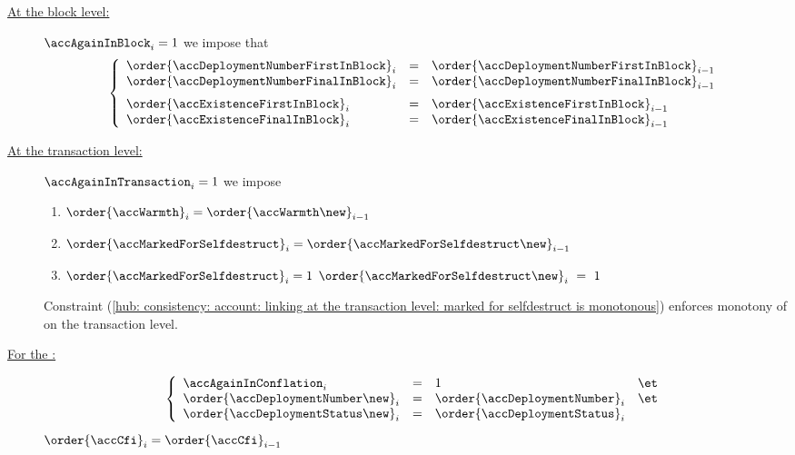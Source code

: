 \begin{description}
	\item[\underline{At the block level:}]
		\If $\accAgainInBlock_{i} = 1$
		\Then we impose that
		\[
			\left\{ \begin{array}{lcl}
				\order{\accDeploymentNumberFirstInBlock} _{i} & = & \order{\accDeploymentNumberFirstInBlock} _{i - 1}              \\
				\order{\accDeploymentNumberFinalInBlock} _{i} & = & \order{\accDeploymentNumberFinalInBlock} _{i - 1} \vspace{2mm} \\
				\order{\accExistenceFirstInBlock}        _{i} & = & \order{\accExistenceFirstInBlock}        _{i - 1}              \\
				\order{\accExistenceFinalInBlock}        _{i} & = & \order{\accExistenceFinalInBlock}        _{i - 1}              \\
			\end{array} \right.
		\]
	\item[\underline{At the transaction level:}]
		\If $\accAgainInTransaction_{i} = 1$
		\Then we impose
		\begin{enumerate}
			\item $\order{\accWarmth}_{i}                = \order{\accWarmth\new}_{i                - 1} $
			\item $\order{\accMarkedForSelfdestruct}_{i} = \order{\accMarkedForSelfdestruct\new}_{i - 1} $
			\item \label{hub: consistency: account: linking at the transaction level: marked for selfdestruct is monotonous} \If $\order{\accMarkedForSelfdestruct}_{i} = 1$ \Then $\order{\accMarkedForSelfdestruct\new}_{i}~=~1$
		\end{enumerate}
		\saNote{}
		Constraint (\ref{hub: consistency: account: linking at the transaction level: marked for selfdestruct is monotonous})
		enforces monotony of \accMarkedForSelfdestruct{} on the transaction level.
	\item[\underline{For the \CFI{}:}]
		\If
		\[
			\left\{ \begin{array}{lclc}
				\accAgainInConflation_{i}             & = & 1                                & \et \\
				\order{\accDeploymentNumber \new}_{i} & = & \order{\accDeploymentNumber}_{i} & \et \\
				\order{\accDeploymentStatus \new}_{i} & = & \order{\accDeploymentStatus}_{i} \\
			\end{array} \right.
		\]
		\Then $\order{\accCfi} _{i} = \order{\accCfi} _{i - 1}$
\end{description}
